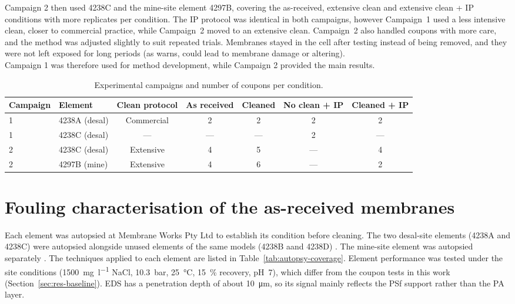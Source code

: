 Campaign 2 then used 4238C and the mine-site element 4297B, covering the as-received, extensive clean and extensive clean + IP conditions with more replicates per condition. The IP protocol was identical in both campaigns, however Campaign~1 used a less intensive clean, closer to commercial practice, while Campaign~2 moved to an extensive clean. Campaign~2 also handled coupons with more care, and the method was adjusted slightly to suit repeated trials. Membranes stayed in the cell after testing instead of being removed, and they were not left exposed for long periods (as \citet{Ogbe2025} warns, could lead to membrane damage or altering). \\

Campaign 1 was therefore used for method development, while Campaign 2 provided the main results.




\begin{table}[htbp]
  \centering
  \caption{Experimental campaigns and number of coupons per condition.}
  \label{tab:campaigns}
  \small
  \begin{tabular}{llccccc}
    \toprule
    Campaign & Element & Clean protocol & As received & Cleaned & No clean + IP & Cleaned + IP \\
    \midrule
    1 & 4238A (desal) & Commercial & 2 & 2 & 2 & 2 \\
    1 & 4238C (desal) & ---  & --- & --- & 2 & --- \\
    2 & 4238C (desal) & Extensive  & 4 & 5& --- & 4 \\
    2 & 4297B (mine)            & Extensive  & 4 & 6 & --- & 2 \\
    \bottomrule
  \end{tabular}
  \par\smallskip
\end{table}



\section{Fouling characterisation of the as-received membranes}
\label{sec:fouling-characterisation}
Each element was autopsied at Membrane Works Pty Ltd to establish its condition before cleaning. The two desal-site elements (4238A and 4238C) were autopsied alongside unused elements of the same models (4238B aand 4238D) \citep{MembraneWorks2025Desal}. The mine-site element was autopsied separately \citep{MembraneWorks2026Mine}. The techniques applied to each element are listed in Table~\ref{tab:autopsy-coverage}. Element performance was tested under the site conditions (\qty{1500}{\milli\gram\per\litre} NaCl, \qty{10.3}{bar}, \qty{25}{\degreeCelsius}, \qty{15}{\percent} recovery, pH~7), which differ from the coupon tests in this work (Section~\ref{sec:res-baseline}). EDS has a penetration depth of about \qty{10}{\micro\metre}, so its signal mainly reflects the PSf support rather than the PA layer.

